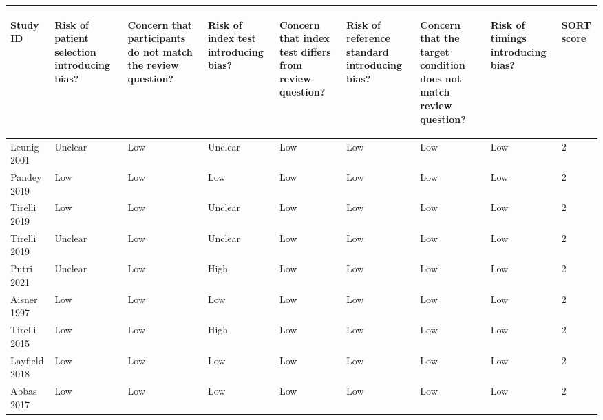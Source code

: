\begin{table}[ht]
\centering
\begingroup\tiny
\begin{tabular}{lllllllll}
  \hline
\begin{sideways} Study ID \end{sideways} & \begin{sideways} Risk of patient selection introducing bias? \end{sideways} & \begin{sideways} Concern that participants do not match the review question? \end{sideways} & \begin{sideways} Risk of index test introducing bias? \end{sideways} & \begin{sideways} Concern that index test differs from review question? \end{sideways} & \begin{sideways} Risk of reference standard introducing bias? \end{sideways} & \begin{sideways} Concern that the target condition does not match review question? \end{sideways} & \begin{sideways} Risk of timings introducing bias? \end{sideways} & \begin{sideways} SORT score \end{sideways} \\ 
  \hline
Leunig 2001 & Unclear & Low & Unclear & Low & Low & Low & Low & 2 \\ 
  Pandey 2019 & Low & Low & Low & Low & Low & Low & Low & 2 \\ 
  Tirelli 2019 & Low & Low & Unclear & Low & Low & Low & Low & 2 \\ 
  Tirelli 2019 & Unclear & Low & Unclear & Low & Low & Low & Low & 2 \\ 
  Putri 2021 & Unclear & Low & High & Low & Low & Low & Low & 2 \\ 
  Aisner 1997 & Low & Low & Low & Low & Low & Low & Low & 2 \\ 
  Tirelli 2015 & Low & Low & High & Low & Low & Low & Low & 2 \\ 
  Layfield 2018 & Low & Low & Low & Low & Low & Low & Low & 2 \\ 
  Abbas 2017 & Low & Low & Low & Low & Low & Low & Low & 2 \\ 

\end{tabular}
\end{table}

